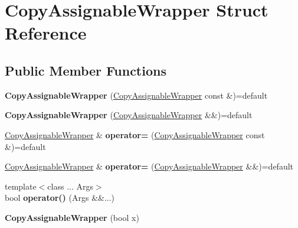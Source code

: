 \hypertarget{struct_copy_assignable_wrapper}{}\section{Copy\+Assignable\+Wrapper Struct Reference}
\label{struct_copy_assignable_wrapper}
\subsection*{Public Member Functions}
\begin{DoxyCompactItemize}
\item 
\mbox{\label{struct_copy_assignable_wrapper_aabe35f59f8607a945dcbc3a86a5a46bc}} 
{\bfseries Copy\+Assignable\+Wrapper} (\mbox{\hyperlink{struct_copy_assignable_wrapper}{Copy\+Assignable\+Wrapper}} const \&)=default
\item 
\mbox{\label{struct_copy_assignable_wrapper_a2accb8cf1043c062209dda8aa4c126ee}} 
{\bfseries Copy\+Assignable\+Wrapper} (\mbox{\hyperlink{struct_copy_assignable_wrapper}{Copy\+Assignable\+Wrapper}} \&\&)=default
\item 
\mbox{\label{struct_copy_assignable_wrapper_ae1e2bb4de0f5205df03ebe2ec7de4c95}} 
\mbox{\hyperlink{struct_copy_assignable_wrapper}{Copy\+Assignable\+Wrapper}} \& {\bfseries operator=} (\mbox{\hyperlink{struct_copy_assignable_wrapper}{Copy\+Assignable\+Wrapper}} const \&)=default
\item 
\mbox{\label{struct_copy_assignable_wrapper_a80de4b4187a0815a91bcfd936cf60732}} 
\mbox{\hyperlink{struct_copy_assignable_wrapper}{Copy\+Assignable\+Wrapper}} \& {\bfseries operator=} (\mbox{\hyperlink{struct_copy_assignable_wrapper}{Copy\+Assignable\+Wrapper}} \&\&)=default
\item 
\mbox{\label{struct_copy_assignable_wrapper_a19a83608b1d2a06b0ee134385fe204f7}} 
{\footnotesize template$<$class ... Args$>$ }\\bool {\bfseries operator()} (Args \&\&...)
\item 
\mbox{\label{struct_copy_assignable_wrapper_ada71b551117588b2f002cee418c10b46}} 
{\bfseries Copy\+Assignable\+Wrapper} (bool x)
\end{DoxyCompactItemize}

